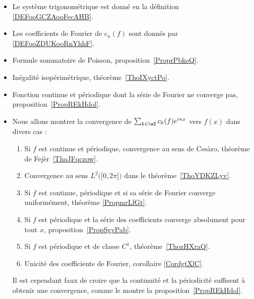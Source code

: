 
       \label{THMooHWEBooTMInve}
\begin{itemize}
	\item Le système trigonométrique est donné en la définition \ref{DEFooGCZAooFecAHB}.
	\item Les coefficients de Fourier de \( c_n(f)\) sont donnés par \ref{DEFooZDUKooRnYhhF}.
	\item Formule sommatoire de Poisson, proposition~\ref{ProprPbkoQ}.
	\item Inégalité isopérimétrique, théorème~\ref{ThoIXyctPo}.
	\item Fonction continue et périodique dont la série de Fourier ne converge pas, proposition~\ref{PropREkHdol}.

	\item
	      Nous allons montrer la convergence de \( \sum_{k\in \eZ}c_k(f) e^{inx}\) vers \( f(x)\) dans divers cas :
	      \begin{enumerate}
		      \item
		            Si \( f\) est continue et périodique, convergence au sens de Cesàro, théorème de Fejèr~\ref{ThoJFqczow}.
		      \item
		            Convergence au sens \( L^2\Big( \mathopen[ 0 , 2\pi \mathclose] \Big)\) dans le théorème~\ref{ThoYDKZLyv}.
		      \item
		            Si \( f\) est continue, périodique et si sa série de Fourier converge uniformément, théorème \ref{PropmrLfGt}.
		      \item
		            Si \( f\) est périodique et la série des coefficients converge absolument pour tout \( x\), proposition~\ref{PropSgvPab}.
		      \item
		            Si \( f\) est périodique et de classe \( C^1\), théorème~\ref{ThozHXraQ}.
		      \item
		            Unicité des coefficients de Fourier, corollaire \ref{CordgtXlC}.
	      \end{enumerate}
	      Il est cependant faux de croire que la continuité et la périodicité suffisent à obtenir une convergence, comme le montre la proposition~\ref{PropREkHdol}.
\end{itemize}
